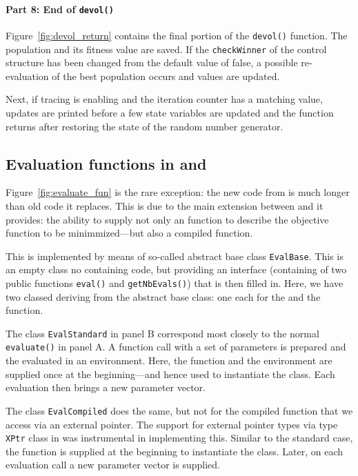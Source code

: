 \documentclass[nojss,shortnames,article]{jss}
\begin{document}
\paragraph{Part 8: End  of  \texttt{devol()}} 

Figure~\ref{fig:devol_return} contains the final portion of the
\verb|devol()| function. The population and its fitness value are saved. If
the \texttt{checkWinner} of the control structure has been changed from the
default value of false, a possible re-evaluation of the best population
occurs and values are updated.  

Next, if tracing is enabling and the iteration counter has a matching value,
updates are printed before a few state variables are updated and the function
returns after restoring the state of the random number generator.


\subsection[Evaluation functions in R and C++]{Evaluation functions in  and }

Figure~\ref{fig:evaluate_fun} is the rare exception: the new code from
 is much longer than old code it replaces.  This is due to the
main extension between  and  it provides: the
ability to supply not only an  function to describe the objective
function to be minimmized---but also a compiled function.

This is implemented by means of so-called abstract base class
\texttt{EvalBase}. This is an empty class no containing code, but providing
an interface (containing of two public functions \texttt{eval()} and
\texttt{getNbEvals()}) that is then filled in.  
Here, we have two classed deriving from the abstract base class: one each for
the  and the  function.  

The class \texttt{EvalStandard} in panel B correspond most closely to the
normal \texttt{evaluate()} in panel A. A function call with a set of
parameters is prepared and the evaluated in an environment. Here, the
function and the environment are supplied once at the beginning---and hence
used to instantiate the class.  Each evaluation then brings a new parameter
vector. 

The class \texttt{EvalCompiled} does the same, but not for the compiled
function that we access via an external pointer. The support for external
pointer types via type \texttt{XPtr} class in  was instrumental in
implementing this.  Similar to the standard case, the function is supplied at
the beginning to instantiate the class.  Later, on each evaluation call a new
parameter vector is supplied.
\end{document}
